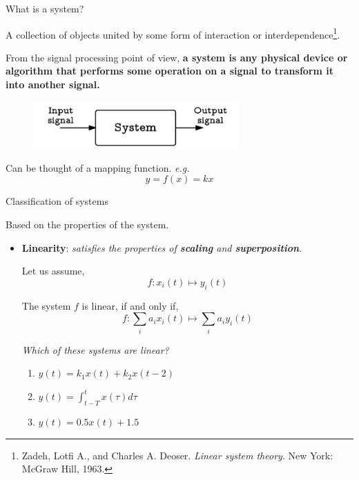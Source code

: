 \documentclass{beamer}
\begin{document}
\begin{frame}{What is a system?}

A collection of objects united by some form of interaction or interdependence\footnote{Zadeh, Lotfi A., and Charles A. Deoser. \textit{Linear system theory}. New York: McGraw Hill, 1963.}.

\vspace{4mm}

From the signal processing point of view, \textbf{a system is any physical device or algorithm that performs some operation on a signal to transform it into another signal.}

\begin{figure}
\includegraphics[width=0.7\textwidth]{img/system.png}
\end{figure}

Can be thought of a mapping function. \textit{e.g.}
\[ y = f\left(x\right) = kx \]

\end{frame}

\begin{frame}{Classification of systems}

Based on the properties of the system.

\begin{itemize}
\item \textbf{Linearity}: \textit{satisfies the properties of \textbf{scaling} and \textbf{superposition}}.

Let us assume, 
\[ f: x_i(t) \mapsto y_i(t) \]

The system $f$ is linear, if and only if,
\[ f:\sum_ia_ix_i(t) \mapsto \sum_ia_iy_i(t) \]

\textit{Which of these systems are linear?}
\begin{enumerate}
\item $y(t) = k_1x(t) + k_2x(t-2)$
\item $y(t) = \int_{t-T}^{t}x(\tau)d\tau$
\item $y(t) = 0.5x(t) + 1.5$
\end{enumerate}
\end{itemize}
\end{frame}
\end{document}
